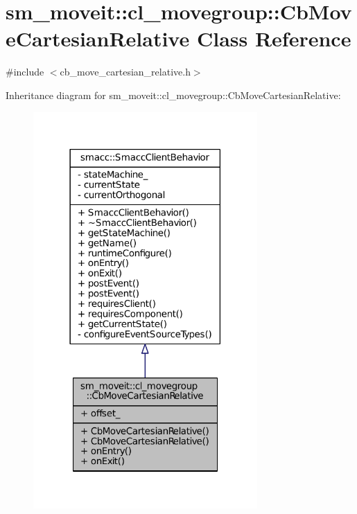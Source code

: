 \hypertarget{classsm__moveit_1_1cl__movegroup_1_1CbMoveCartesianRelative}{}\section{sm\+\_\+moveit\+:\+:cl\+\_\+movegroup\+:\+:Cb\+Move\+Cartesian\+Relative Class Reference}
\label{classsm__moveit_1_1cl__movegroup_1_1CbMoveCartesianRelative}


{\ttfamily \#include $<$cb\+\_\+move\+\_\+cartesian\+\_\+relative.\+h$>$}



Inheritance diagram for sm\+\_\+moveit\+:\+:cl\+\_\+movegroup\+:\+:Cb\+Move\+Cartesian\+Relative\+:
\nopagebreak
\begin{figure}[H]
\begin{center}
\leavevmode
\includegraphics[width=242pt]{classsm__moveit_1_1cl__movegroup_1_1CbMoveCartesianRelative__inherit__graph}
\end{center}
\end{figure}


